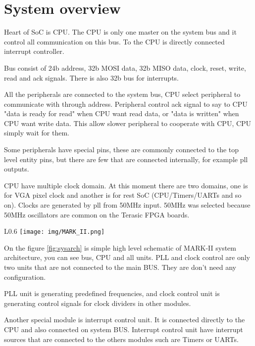 \section{System overview}

Heart of SoC is CPU. The CPU is only one master on the system bus and it control
all communication on this bus. To the CPU is directly connected interrupt
controller.

Bus consist of 24b address, 32b MOSI data, 32b MISO data, clock, reset, write,
read and ack signals. There is also 32b bus for interrupts.

All the peripherals are connected to the system bus, CPU select peripheral to
communicate with through address. Peripheral control ack signal to say to CPU
"data is ready for read" when CPU want read data, or "data is written" when CPU
want write data. This allow slower peripheral to cooperate with CPU, CPU simply
wait for them.

Some peripherals have special pins, these are commonly connected to the top
level entity pins, but there are few that are connected internally, for example
pll outputs.

CPU have multiple clock domain. At this moment there are two domains, one is for
VGA pixel clock and another is for rest SoC (CPU/Timers/UARTs and so on).
Clocks are generated by pll from 50MHz input. 50MHz was selected because 50MHz
oscillators are common on the Terasic FPGA boards.

\begin{wrapfigure}{L}{0.6\textwidth}
    \centering
    \texttt{[image: img/MARK\_II.png]}
    \caption{MARK-II system architecture}
    \label{fig:sysarch}
\end{wrapfigure}

On the figure \ref{fig:sysarch} is simple high level schematic of MARK-II system architecture,
you can see bus, CPU and all units. PLL and clock control are only two units
that are not connected to the main BUS. They are don't need any configuration.

PLL unit is generating predefined frequencies, and clock control unit is
generating control signals for clock dividers in other modules.

Another special module is interrupt control unit. It is connected directly to
the CPU and also connected on system BUS. Interrupt control unit have interrupt
sources that are connected to the others modules such are Timers or UARTs.
